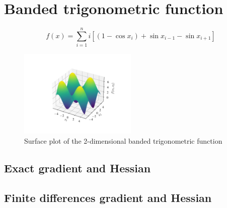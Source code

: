 \section{Banded trigonometric function}
\label{sec:banded_trigonometric_results}

\[
f(x) = \sum_{i=1}^n i[(1-\cos x_i) + \sin x_{i-1} - \sin x_{i+1}]
\]

\begin{figure}
    \centering
    \includegraphics[width=0.5\textwidth]{figures/banded_trigonometric_surf.pdf}
    \caption{Surface plot of the 2-dimensional banded trigonometric function}
    \label{fig:banded_trigonometric_surf}
\end{figure}

\subsection{Exact gradient and Hessian}

\subsection{Finite differences gradient and Hessian}
